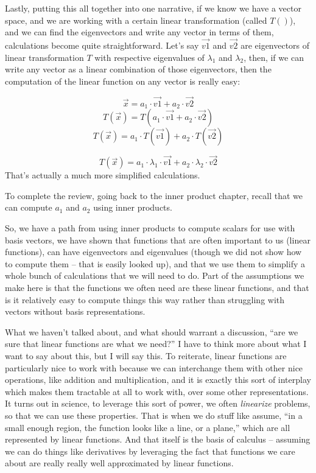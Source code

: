 \documentclass[
]{book}
\begin{document}
Lastly, putting this all together into one narrative, if we know we have a vector space, and we are working with a certain linear transformation (called \(T()\)), and we can find the eigenvectors and write any vector in terms of them, calculations become quite straightforward. Let's say \(\vec{v1}\) and \(\vec{v2}\) are eigenvectors of linear transformation \(T\) with respective eigenvalues of \(\lambda_{1}\) and \(\lambda_{2}\), then, if we can write any vector as a linear combination of those eigenvectors, then the computation of the linear function on any vector is really easy:

\[\vec{x} = a_{1} \cdot \vec{v1} +a_{2} \cdot \vec{v2}\]
\[T(\vec{x}) = T(a_{1} \cdot \vec{v1} +a_{2} \cdot \vec{v2})\]
\[T(\vec{x}) = a_{1} \cdot T(\vec{v1}) +a_{2} \cdot T(\vec{v2})\]

\[T(\vec{x}) = a_{1} \cdot \lambda_1 \cdot \vec{v1} +a_{2} \cdot \lambda_2 \cdot \vec{v2}\]
That's actually a much more simplified calculations.

To complete the review, going back to the inner product chapter, recall that we can compute \(a_1\) and \(a_2\) using inner products.

So, we have a path from using inner products to compute scalars for use with basis vectors, we have shown that functions that are often important to us (linear functions), can have eigenvectors and eigenvalues (though we did not show how to compute them -- that is easily looked up), and that we use them to simplify a whole bunch of calculations that we will need to do. Part of the assumptions we make here is that the functions we often need are these linear functions, and that is it relatively easy to compute things this way rather than struggling with vectors without basis representations.

What we haven't talked about, and what should warrant a discussion, ``are we sure that linear functions are what we need?'' I have to think more about what I want to say about this, but I will say this. To reiterate, linear functions are particularly nice to work with because we can interchange them with other nice operations, like addition and multiplication, and it is exactly this sort of interplay which makes them tractable at all to work with, over some other representations. It turns out in science, to leverage this sort of power, we often \emph{linearize} problems, so that we can use these properties. That is when we do stuff like assume, ``in a small enough region, the function looks like a line, or a plane,'' which are all represented by linear functions. And that itself is the basis of calculus -- assuming we can do things like derivatives by leveraging the fact that functions we care about are really really well approximated by linear functions.
\end{document}
